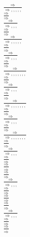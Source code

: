 \documentclass[11pt]{article}
\begin{document}
\begin{center}
\bigskip
\\$\frac{\Rightarrow }{\Rightarrow , , , , , }$
\bigskip
\\$\frac{\Rightarrow }{\Rightarrow }$
\bigskip
\\$\frac{\Rightarrow }{\Rightarrow , , , }$
\bigskip
\\$\frac{\Rightarrow }{\Rightarrow }$
\bigskip
\\$\frac{\Rightarrow }{\Rightarrow , , , , , }$
\bigskip
\\$\frac{\Rightarrow }{\Rightarrow }$
\bigskip
\\$\frac{\Rightarrow }{\Rightarrow , , , }$
\bigskip
\\$\frac{\Rightarrow }{\Rightarrow }$
\bigskip
\\$\frac{\Rightarrow }{\Rightarrow , , , , , , , }$
\bigskip
\\$\frac{\Rightarrow }{\Rightarrow }$
\bigskip
\\$\frac{\Rightarrow }{\Rightarrow , , , }$
\bigskip
\\$\frac{\Rightarrow }{\Rightarrow }$
\bigskip
\\$\frac{\Rightarrow }{\Rightarrow , , , , , , , }$
\bigskip
\\$\frac{\Rightarrow }{\Rightarrow }$
\bigskip
\\$\frac{\Rightarrow }{\Rightarrow , , , }$
\bigskip
\\$\frac{\Rightarrow }{\Rightarrow }$
\bigskip
\\$\frac{\Rightarrow }{\Rightarrow , , , , , , , }$
\bigskip
\\$\frac{\Rightarrow }{\Rightarrow }$
\bigskip
\\$\frac{\Rightarrow }{\Rightarrow , , , }$
\bigskip
\\$\frac{\Rightarrow }{\Rightarrow }$
\bigskip
\\$\frac{\Rightarrow }{\Rightarrow }$
\bigskip
\\$\frac{\Rightarrow }{\Rightarrow }$
\bigskip
\\$\frac{\Rightarrow }{\Rightarrow , , , }$
\bigskip
\\$\frac{\Rightarrow }{\Rightarrow }$
\bigskip
\\$\frac{\Rightarrow }{\Rightarrow }$
\bigskip
\\$\frac{\Rightarrow }{\Rightarrow }$
\bigskip
\\$\frac{\Rightarrow }{\Rightarrow , , , }$
\bigskip
\\$\frac{\Rightarrow }{\Rightarrow }$
\bigskip
\\$\frac{\Rightarrow }{\Rightarrow }$

\end{center}
\end{document}
